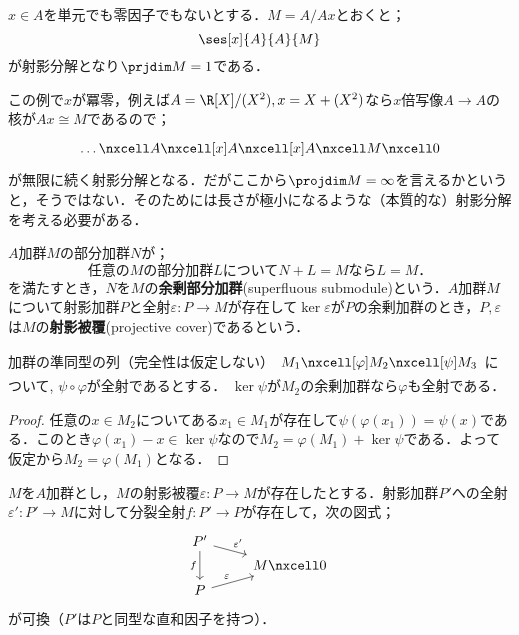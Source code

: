 \begin{ex}
	$x\in A$を単元でも零因子でもないとする．$M=A/Ax$とおくと；
	\[\ses[x]{A}{A}{M}\]
	が射影分解となり$\prjdim M=1$である．
\end{ex}

この例で$x$が冪零，例えば$A=\R[X]/(X^2),x=X+(X^2)$なら$x$倍写像$A\to A$の核が$Ax\cong M$であるので；
\[\begin{tikzcd}
	\dots\nxcell A\nxcell[x]A\nxcell[x] A\nxcell M\nxcell0
\end{tikzcd}\]
が無限に続く射影分解となる．だがここから$\projdim M=\infty$を言えるかというと，そうではない．そのためには長さが極小になるような（本質的な）射影分解を考える必要がある．

\begin{defi}[射影被覆]
	$A$加群$M$の部分加群$N$が；
	\[\text{任意の$M$の部分加群$L$について$N+L=M$なら$L=M$．}\]
	を満たすとき，$N$を$M$の\textbf{余剰部分加群}(superfluous submodule)という．$A$加群$M$について射影加群$P$と全射$\varepsilon:P\to M$が存在して$\ker\varepsilon$が$P$の余剰加群のとき，$P,\varepsilon$は$M$の\textbf{射影被覆}(projective cover)であるという．
\end{defi}

\begin{lem}\label{lem:余剰加群の補題}
	加群の準同型の列（完全性は仮定しない）$\begin{tikzcd}
	M_1\nxcell[\varphi]M_2\nxcell[\psi]M_3
	\end{tikzcd}$について, $\psi\circ\varphi$が全射であるとする． $\ker\psi $が$M_2$の余剰加群なら$\varphi$も全射である．
\end{lem}

\begin{proof}
	任意の$x\in M_2$についてある$x_1\in M_1$が存在して$\psi(\varphi(x_1))=\psi(x)$である．このとき$\varphi(x_1)-x\in\ker\psi$なので$M_2=\varphi(M_1)+\ker\psi$である．よって仮定から$M_2=\varphi(M_1)$となる．
\end{proof}

\begin{prop}
	$M$を$A$加群とし，$M$の射影被覆$\varepsilon:P\to M$が存在したとする．射影加群$P'$への全射$\varepsilon':P'\to M$に対して分裂全射$f:P'\to P$が存在して，次の図式；
	\[\begin{tikzcd}
		P'\arrow[dd,"f",swap]\arrow[dr,"\varepsilon'"]\\[-1.5em]
		&M\nxcell0\\[-1.5em]
		P\arrow[ur,"\varepsilon"]
	\end{tikzcd}\]
	が可換（$P'$は$P$と同型な直和因子を持つ）．
\end{prop}


